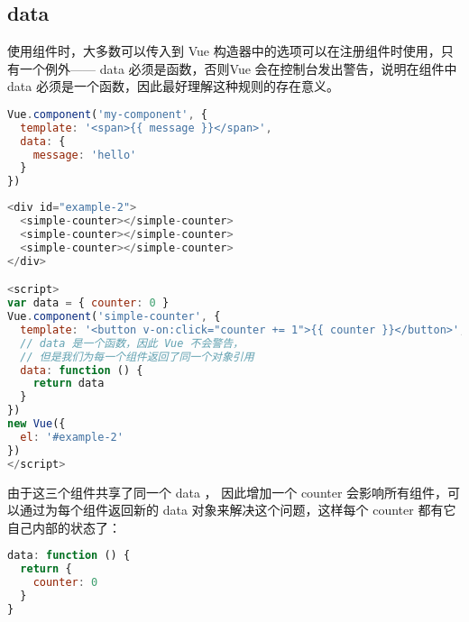 \subsection{data}


使用组件时，大多数可以传入到 Vue 构造器中的选项可以在注册组件时使用，只有一个例外—— data 必须是函数，否则Vue 会在控制台发出警告，说明在组件中 data 必须是一个函数，因此最好理解这种规则的存在意义。



\begin{lstlisting}[language=JavaScript]
Vue.component('my-component', {
  template: '<span>{{ message }}</span>',
  data: {
    message: 'hello'
  }
})
\end{lstlisting}


\begin{lstlisting}[language=JavaScript]
<div id="example-2">
  <simple-counter></simple-counter>
  <simple-counter></simple-counter>
  <simple-counter></simple-counter>
</div>

<script>
var data = { counter: 0 }
Vue.component('simple-counter', {
  template: '<button v-on:click="counter += 1">{{ counter }}</button>',
  // data 是一个函数，因此 Vue 不会警告，
  // 但是我们为每一个组件返回了同一个对象引用
  data: function () {
    return data
  }
})
new Vue({
  el: '#example-2'
})
</script>
\end{lstlisting}

由于这三个组件共享了同一个 data ， 因此增加一个 counter 会影响所有组件，可以通过为每个组件返回新的 data 对象来解决这个问题，这样每个 counter 都有它自己内部的状态了：

\begin{lstlisting}[language=JavaScript]
data: function () {
  return {
    counter: 0
  }
}
\end{lstlisting}




\begin{lstlisting}[language=JavaScript]

\end{lstlisting}




\begin{lstlisting}[language=JavaScript]

\end{lstlisting}





\begin{lstlisting}[language=JavaScript]

\end{lstlisting}




